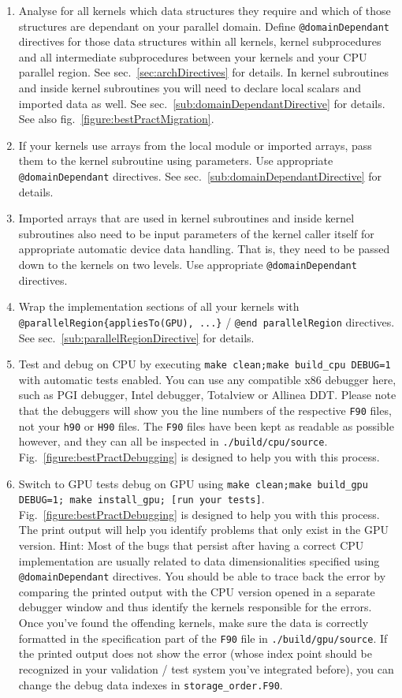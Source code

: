 \begin{enumerate}
 \item Analyse for all kernels which data structures they require and which of those structures are dependant on your parallel domain. Define \verb|@domainDependant| directives for those data structures within all kernels, kernel subprocedures and all intermediate subprocedures between your kernels and your CPU parallel region. See sec.~\ref{sec:archDirectives} for details. In kernel subroutines and inside kernel subroutines you will need to declare local scalars and imported data as well. See sec.~\ref{sub:domainDependantDirective} for details. See also fig.~\ref{figure:bestPractMigration}.
 \item If your kernels use arrays from the local module or imported arrays, pass them to the kernel subroutine using parameters. Use appropriate \verb|@domainDependant| directives. See sec.~\ref{sub:domainDependantDirective} for details.
 \item Imported arrays that are used in kernel subroutines and inside kernel subroutines also need to be input parameters of the kernel caller itself for appropriate automatic device data handling. That is, they need to be passed down to the kernels on two levels. Use appropriate \verb|@domainDependant| directives.
 \item Wrap the implementation sections of all your kernels with \linebreak\verb|@parallelRegion{appliesTo(GPU), ...}| / \verb|@end parallelRegion| directives. See sec.~\ref{sub:parallelRegionDirective} for details.
 \item Test and debug on CPU by executing \linebreak\verb|make clean;make build_cpu DEBUG=1| with automatic tests enabled. You can use any compatible x86 debugger here, such as PGI debugger, Intel debugger, Totalview or Allinea DDT. Please note that the debuggers will show you the line numbers of the respective \verb|F90| files, not your \verb|h90| or \verb|H90| files. The \verb|F90| files have been kept as readable as possible however, and they can all be inspected in \verb|./build/cpu/source|. Fig.~\ref{figure:bestPractDebugging} is designed to help you with this process.
 \item Switch to GPU tests debug on GPU using \linebreak\verb|make clean;make build_gpu DEBUG=1; make install_gpu; [run your tests]|. Fig.~\ref{figure:bestPractDebugging} is designed to help you with this process. The print output will help you identify problems that only exist in the GPU version. Hint: Most of the bugs that persist after having a correct CPU implementation are usually related to data dimensionalities specified using \verb|@domainDependant| directives. You should be able to trace back the error by comparing the printed output with the CPU version opened in a separate debugger window and thus identify the kernels responsible for the errors. Once you've found the offending kernels, make sure the data is correctly formatted in the specification part of the \verb|F90| file in \verb|./build/gpu/source|. If the printed output does not show the error (whose index point should be recognized in your validation / test system you've integrated before), you can change the debug data indexes in \verb|storage_order.F90|.

\end{enumerate}
